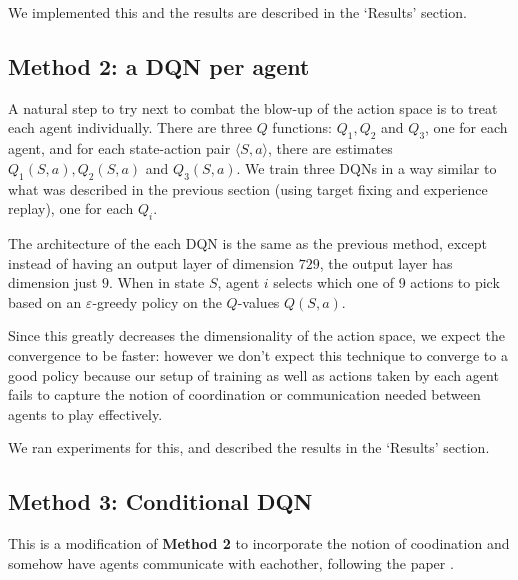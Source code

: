 \documentclass{article}
\begin{document}
We implemented this and the results are described in
the `Results' section.

\subsection{Method 2: a DQN per agent}
A natural step to try next to combat the blow-up
of the action space is to treat each agent
individually. There are three $Q$ functions:
$Q_1, Q_2$ and $Q_3$, one for each agent, and
for each state-action pair $\langle S,a\rangle$,
there are estimates $Q_1(S,a),Q_2(S,a)$ and
$Q_3(S,a)$. We train three DQNs in a way similar
to what was described in the previous section
(using target fixing and experience replay), one for
each $Q_i$.

The architecture of the each DQN is the same as the
previous method, except instead of having an output
layer of dimension $729$, the output layer has dimension
just $9$. When in state $S$, agent $i$ selects which one
of 9 actions to pick based on an $\varepsilon$-greedy policy
on the $Q$-values $Q(S,a)$.

Since this greatly decreases the dimensionality of
the action space, we expect the convergence to be
faster: however we don't expect this technique to
converge to a good policy because our setup
of training as well as actions taken by each agent
fails to capture the notion of coordination or
communication needed between agents to play effectively.

We ran experiments for this, and described the results in
the `Results' section.

\subsection{Method 3: Conditional DQN}
This is a modification of \textbf{Method 2} to incorporate
the notion of coodination and somehow have agents communicate
with eachother, following the paper \cite{foerster2016learning}.
\end{document}
